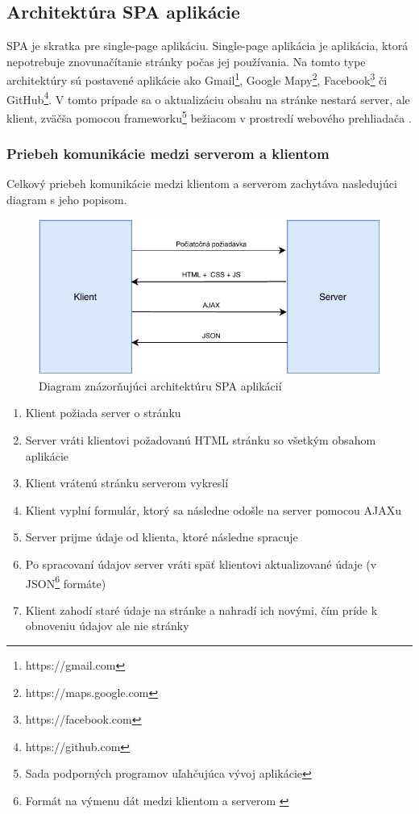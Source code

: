 \subsection{Architektúra SPA aplikácie}
SPA je skratka pre single-page aplikáciu. Single-page aplikácia je aplikácia, ktorá nepotrebuje znovunačítanie stránky počas jej používania. Na tomto type architektúry sú postavené aplikácie ako Gmail\footnote{https://gmail.com}, Google Mapy\footnote{https://maps.google.com}, Facebook\footnote{https://facebook.com} či GitHub\footnote{https://github.com}. V tomto prípade sa o aktualizáciu obsahu na stránke nestará server, ale klient, zväčša pomocou frameworku\footnote{Sada podporných programov uľahčujúca vývoj aplikácie} bežiacom v prostredí webového prehliadača \cite{spa-vs-mpa-3}.

\subsubsection*{Priebeh komunikácie medzi serverom a klientom}
Celkový priebeh komunikácie medzi klientom a serverom zachytáva nasledujúci diagram s jeho popisom.

\begin{figure}[H]
	\includegraphics[width=1.0\textwidth]{media/navrh/SPA.pdf}
	\caption{Diagram znázorňujúci architektúru SPA aplikácií}\label{spa-graf}
\end{figure}

\begin{enumerate}
	\item Klient požiada server o stránku
	\item Server vráti klientovi požadovanú HTML stránku so všetkým obsahom aplikácie
	\item Klient vrátenú stránku serverom vykreslí
	\item Klient vyplní formulár, ktorý sa následne odošle na server pomocou AJAXu
	\item Server prijme údaje od klienta, ktoré následne spracuje
	\item Po spracovaní údajov server vráti späť klientovi aktualizované údaje (v JSON\footnote{Formát na výmenu dát medzi klientom a serverom \cite{co-je-json} } formáte)
	\item Klient zahodí staré údaje na stránke a nahradí ich novými, čím príde k obnoveniu údajov ale nie stránky
\end{enumerate}


